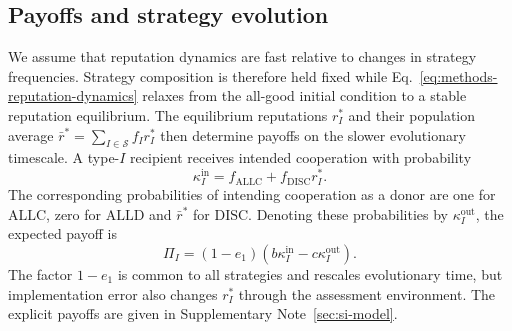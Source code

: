 \documentclass[fleqn,10pt]{wlscirep}
\begin{document}
\subsection*{Payoffs and strategy evolution}

We assume that reputation dynamics are fast relative to changes in strategy frequencies. Strategy composition is therefore held fixed while Eq.~\eqref{eq:methods-reputation-dynamics} relaxes from the all-good initial condition to a stable reputation equilibrium. The equilibrium reputations $r_I^*$ and their population average $\bar r^*=\sum_{I\in\mathcal S}f_Ir_I^*$ then determine payoffs on the slower evolutionary timescale. A type-$I$ recipient receives intended cooperation with probability
\begin{equation}
\kappa_I^{\mathrm{in}}
=f_{\mathrm{ALLC}}+f_{\mathrm{DISC}}r_I^*.
\label{eq:methods-incoming-cooperation}
\end{equation}
The corresponding probabilities of intending cooperation as a donor are one for $\mathrm{ALLC}$, zero for $\mathrm{ALLD}$ and $\bar r^*$ for $\mathrm{DISC}$. Denoting these probabilities by $\kappa_I^{\mathrm{out}}$, the expected payoff is
\begin{equation}
\Pi_I=(1-e_1)
\left(b\kappa_I^{\mathrm{in}}-c\kappa_I^{\mathrm{out}}\right).
\label{eq:methods-payoff}
\end{equation}
The factor $1-e_1$ is common to all strategies and rescales evolutionary time, but implementation error also changes $r_I^*$ through the assessment environment. The explicit payoffs are given in Supplementary Note~\ref{sec:si-model}.
\end{document}
